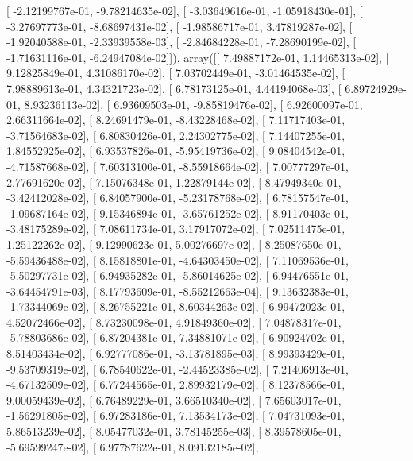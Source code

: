 \documentclass{article}
\begin{document}
       [ -2.12199767e-01,  -9.78214635e-02],
       [ -3.03649616e-01,  -1.05918430e-01],
       [ -3.27697773e-01,  -8.68697431e-02],
       [ -1.98586717e-01,   3.47819287e-02],
       [ -1.92040588e-01,  -2.33939558e-03],
       [ -2.84684228e-01,  -7.28690199e-02],
       [ -1.71631116e-01,  -6.24947084e-02]]), array([[  7.49887172e-01,   1.14465313e-02],
       [  9.12825849e-01,   4.31086170e-02],
       [  7.03702449e-01,  -3.01464535e-02],
       [  7.98889613e-01,   4.34321723e-02],
       [  6.78173125e-01,   4.44194068e-03],
       [  6.89724929e-01,   8.93236113e-02],
       [  6.93609503e-01,  -9.85819476e-02],
       [  6.92600097e-01,   2.66311664e-02],
       [  8.24691479e-01,  -8.43228468e-02],
       [  7.11717403e-01,  -3.71564683e-02],
       [  6.80830426e-01,   2.24302775e-02],
       [  7.14407255e-01,   1.84552925e-02],
       [  6.93537826e-01,  -5.95419736e-02],
       [  9.08404542e-01,  -4.71587668e-02],
       [  7.60313100e-01,  -8.55918664e-02],
       [  7.00777297e-01,   2.77691620e-02],
       [  7.15076348e-01,   1.22879144e-02],
       [  8.47949340e-01,  -3.42412028e-02],
       [  6.84057900e-01,  -5.23178768e-02],
       [  6.78157547e-01,  -1.09687164e-02],
       [  9.15346894e-01,  -3.65761252e-02],
       [  8.91170403e-01,  -3.48175289e-02],
       [  7.08611734e-01,   3.17917072e-02],
       [  7.02511475e-01,   1.25122262e-02],
       [  9.12990623e-01,   5.00276697e-02],
       [  8.25087650e-01,  -5.59436488e-02],
       [  8.15818801e-01,  -4.64303450e-02],
       [  7.11069536e-01,  -5.50297731e-02],
       [  6.94935282e-01,  -5.86014625e-02],
       [  6.94476551e-01,  -3.64454791e-03],
       [  8.17793609e-01,  -8.55212663e-04],
       [  9.13632383e-01,  -1.73344069e-02],
       [  8.26755221e-01,   8.60344263e-02],
       [  6.99472023e-01,   4.52072466e-02],
       [  8.73230098e-01,   4.91849360e-02],
       [  7.04878317e-01,  -5.78803686e-02],
       [  6.87204381e-01,   7.34881071e-02],
       [  6.90924702e-01,   8.51403434e-02],
       [  6.92777086e-01,  -3.13781895e-03],
       [  8.99393429e-01,  -9.53709319e-02],
       [  6.78540622e-01,  -2.44523385e-02],
       [  7.21406913e-01,  -4.67132509e-02],
       [  6.77244565e-01,   2.89932179e-02],
       [  8.12378566e-01,   9.00059439e-02],
       [  6.76489229e-01,   3.66510340e-02],
       [  7.65603017e-01,  -1.56291805e-02],
       [  6.97283186e-01,   7.13534173e-02],
       [  7.04731093e-01,   5.86513239e-02],
       [  8.05477032e-01,   3.78145255e-03],
       [  8.39578605e-01,  -5.69599247e-02],
       [  6.97787622e-01,   8.09132185e-02],
\end{document}
